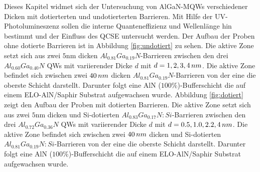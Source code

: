 % 
Dieses Kapitel widmet sich der Untersuchung von AlGaN-MQWs verschiedener Dicken mit dotierterten und undotierterten Barrieren. Mit Hilfe der UV-Photolumineszenz sollen die interne Quanteneffizienz und Wellenlänge hin bestimmt und der Einfluss des QCSE untersucht werden. 
Der Aufbau der Proben ohne dotierte Barrieren ist in Abbildung \ref{fig:undotiert} zu sehen.
Die aktive Zone setzt sich aus zwei $5$nm dicken $ Al_{0.81}Ga_{0.19}N$-Barrieren zwischen den drei $ Al_{0.60}Ga_{0.40}N$ QWs mit variierender Dicke $d$ mit $d=1,2,3,4 \thinspace nm$. Die aktive Zone befindet sich zwischen zwei $40 \thinspace nm$ dicken $ Al_{0.81}Ga_{0.19}N$-Barrieren von der eine die oberste Schicht darstellt. Darunter folgt eine AlN ($100\%$)-Bufferschicht die auf einem ELO-AlN/Saphir Substrat aufgewachsen wurde. 
Abbildung \ref{fig:dotiert} zeigt den Aufbau der Proben mit dotierten Barrieren. Die aktive Zone setzt sich aus zwei $5$nm dicken und Si-dotierten $ Al_{0.83}Ga_{0.17}N:Si$-Barrieren zwischen den drei $ Al_{0.72}Ga_{0.36}N$ QWs mit variierender Dicke $d$ mit $d=0.5,1.0,2.2,4 \thinspace nm$. Die aktive Zone befindet sich zwischen zwei $40 \thinspace nm$ dicken und Si-dotierten $ Al_{0.81}Ga_{0.19}N:Si$-Barrieren von der eine die oberste Schicht darstellt. Darunter folgt eine AlN ($100\%$)-Bufferschicht die auf einem ELO-AlN/Saphir Substrat aufgewachsen wurde. 
%

